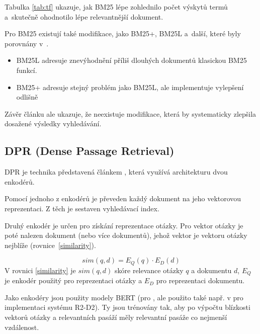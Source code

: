 Tabulka \ref{tab:tf} ukazuje, jak BM25 lépe zohlednilo počet výskytů termů a~skutečně ohodnotilo lépe relevantnější dokument.\par \medskip
Pro BM25 existují také modifikace, jako BM25+, BM25L a~další, které byly porovnány v~\cite{bm25_improvements}.\par
\begin{itemize}
    \item BM25L \cite{bm25_too_long} adresuje znevýhodnění příliš dlouhých dokumentů klasickou BM25 funkcí.
    \item BM25+ \cite{bm25_plus} adresuje stejný problém jako BM25L, ale implementuje vylepšení odlišně
\end{itemize}
Závěr článku \cite{bm25_improvements} ale ukazuje, že neexistuje modifikace, která by systematicky zlepšila dosažené výsledky vyhledávání.\par

\subsection{DPR (Dense Passage Retrieval)}
\label{dpr}
DPR je technika představená článkem \cite{dpr}, která využívá architekturu dvou enkodérů.\par
Pomocí jednoho z enkodérů je převeden každý dokument na jeho vektorovou reprezentaci. Z těch je sestaven vyhledávací index.\par
Druhý enkodér je určen pro získání reprezentace otázky. Pro vektor otázky je poté nalezen dokument (nebo více dokumentů), jehož vektor je vektoru otázky nejblíže (rovnice~\ref{similarity}).\par
\begin{equation}
    \label{similarity}
    sim(q,d) = E_Q(q)\cdot E_D(d)
\end{equation}
V rovnici \ref{similarity} \cite{dpr} je $sim(q,d)$ skóre relevance otázky $q$ a dokumentu $d$, $E_Q$ je enkodér použitý pro reprezentaci otázky a $E_D$ pro reprezentaci dokumentu.\par
Jako enkodéry jsou použity modely BERT (pro \cite{dpr}, ale použito také např. v \cite{fajcik2021pruning} pro implementaci systému R2-D2). Ty jsou trénovány tak, aby po výpočtu blízkosti vektorů otázky a relevantních pasáží měly relevantní pasáže co nejmenší vzdálenost.


